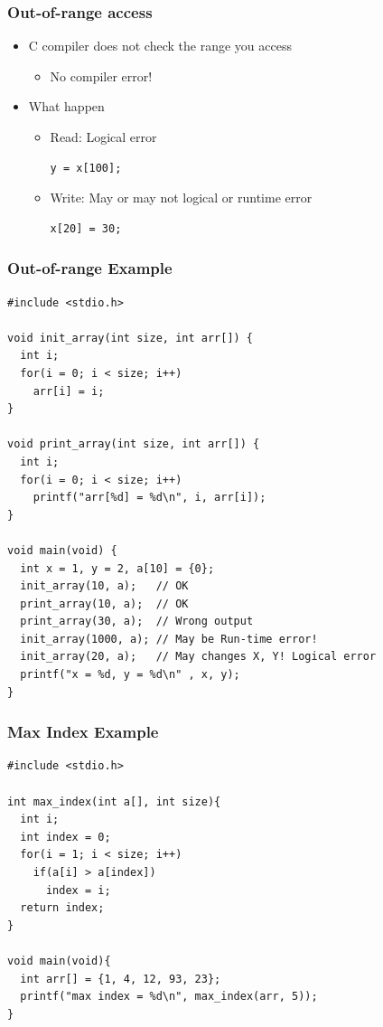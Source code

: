 \documentclass{../c-lecture}
\begin{document}
\begin{frame}[fragile]
  \frametitle{Out-of-range access}
  \begin{itemize}
    \item C compiler does not check the range you access
    \begin{itemize}
      \begin{verbatim}
int x[10]; x[20] = 30; y = x[100];
      \end{verbatim}
      \item No compiler error!
    \end{itemize}
    \item What happen
    \begin{itemize}
      \item Read: Logical error
      \begin{verbatim}
y = x[100];
      \end{verbatim}
      \item Write: May or may not logical or runtime error
      \begin{verbatim}
x[20] = 30;
      \end{verbatim}
    \end{itemize}
  \end{itemize}
\end{frame}

\begin{frame}[fragile]
  \frametitle{Out-of-range Example}
  \scriptsize
  \begin{verbatim}
#include <stdio.h>

void init_array(int size, int arr[]) {
  int i;
  for(i = 0; i < size; i++)
    arr[i] = i;
}

void print_array(int size, int arr[]) {
  int i;
  for(i = 0; i < size; i++)
    printf("arr[%d] = %d\n", i, arr[i]);
}

void main(void) {
  int x = 1, y = 2, a[10] = {0};
  init_array(10, a);   // OK
  print_array(10, a);  // OK
  print_array(30, a);  // Wrong output
  init_array(1000, a); // May be Run-time error!
  init_array(20, a);   // May changes X, Y! Logical error
  printf("x = %d, y = %d\n" , x, y);
}
  \end{verbatim}
\end{frame}

\begin{frame}[fragile]
  \frametitle{Max Index Example}
  \scriptsize
  \begin{verbatim}
#include <stdio.h>

int max_index(int a[], int size){
  int i;
  int index = 0;
  for(i = 1; i < size; i++)
    if(a[i] > a[index])
      index = i;
  return index;
}

void main(void){
  int arr[] = {1, 4, 12, 93, 23};
  printf("max index = %d\n", max_index(arr, 5));
}
  \end{verbatim}
\end{frame}
\end{document}
